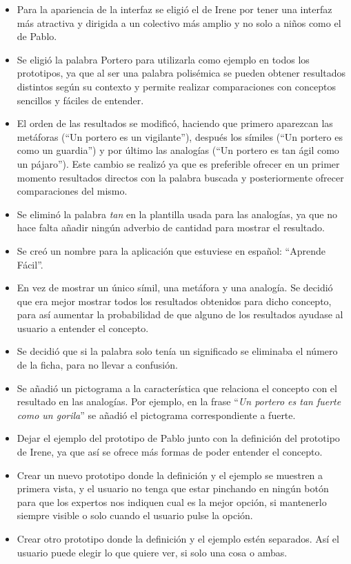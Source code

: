 \begin{itemize}
	\item Para la apariencia de la interfaz se eligió el de Irene por tener una interfaz más atractiva y dirigida a un colectivo más amplio y no solo a niños como el de Pablo.
	\item Se eligió la palabra Portero para utilizarla como ejemplo en todos los prototipos, ya que al ser una palabra polisémica se pueden obtener resultados distintos según su contexto y permite realizar comparaciones con conceptos sencillos y fáciles de entender.
	\item El orden de las resultados se modificó, haciendo que primero aparezcan las metáforas (``Un portero es un vigilante''), después los símiles (``Un portero es como un guardia'') y por último las analogías  (``Un portero es tan ágil como un pájaro''). Este cambio se realizó ya que es preferible ofrecer en un primer momento resultados directos con la palabra buscada y posteriormente ofrecer comparaciones del mismo.
	\item Se eliminó la palabra \textit{tan} en la plantilla usada para las analogías, ya que no hace falta añadir ningún adverbio de cantidad para mostrar el resultado.
	\item Se creó un nombre para la aplicación que estuviese en español: ``Aprende Fácil''.
	\item En vez de mostrar un único símil, una metáfora y una analogía. Se decidió que era mejor mostrar todos los resultados obtenidos para dicho concepto, para así aumentar la probabilidad de que alguno de los resultados ayudase al usuario a entender el concepto.
	
	\item Se decidió que si la palabra solo tenía un significado se eliminaba el número de la ficha, para no llevar a confusión.
	\item Se añadió un pictograma a la característica que relaciona el concepto con el resultado en las analogías. Por ejemplo, en la frase ``\textit{Un portero es tan fuerte como un gorila}''  se añadió el pictograma correspondiente a fuerte.
	\item Dejar el ejemplo del prototipo de Pablo junto con la definición del prototipo de Irene, ya que así se ofrece más formas de poder entender el concepto.
	\item Crear un nuevo prototipo donde la definición y el ejemplo se muestren a primera vista, y el usuario no tenga que estar pinchando en ningún botón para que los expertos nos indiquen cual es la mejor opción, si mantenerlo siempre visible o solo cuando el usuario pulse la opción.
	\item Crear otro prototipo donde la definición y el ejemplo estén separados. Así el usuario puede elegir lo que quiere ver, si solo una cosa o ambas.
\end{itemize} 

